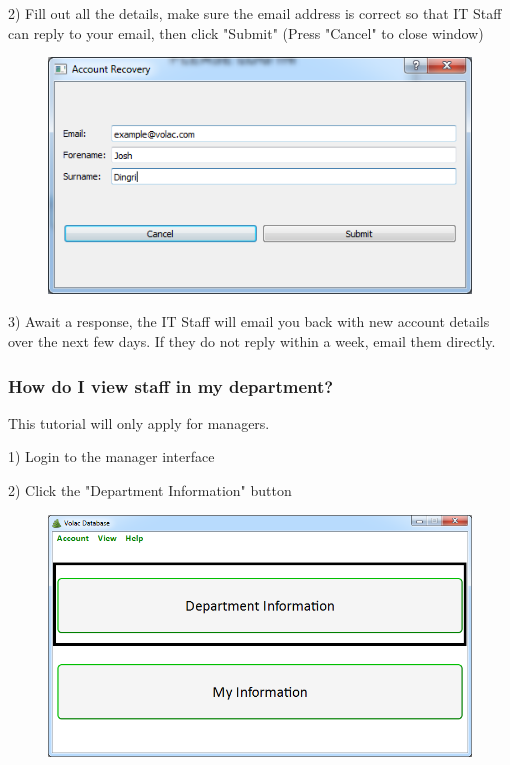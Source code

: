 2) Fill out all the details, make sure the email address is correct so that IT Staff can reply to your email, then click "Submit" (Press "Cancel" to close window)

\begin{figure}[H]
    \includegraphics[width=\textwidth]{./Manual/Images/forgot2.png}
\end{figure}

3) Await a response, the IT Staff will email you back with new account details over the next few days. If they do not reply within a week, email them directly.

\subsubsection{How do I view staff in my department?}\label{department}

This tutorial will only apply for managers.

1) Login to the manager interface

2) Click the "Department Information" button

\begin{figure}[H]
    \includegraphics[width=\textwidth]{./Manual/Images/department.png}
\end{figure}

